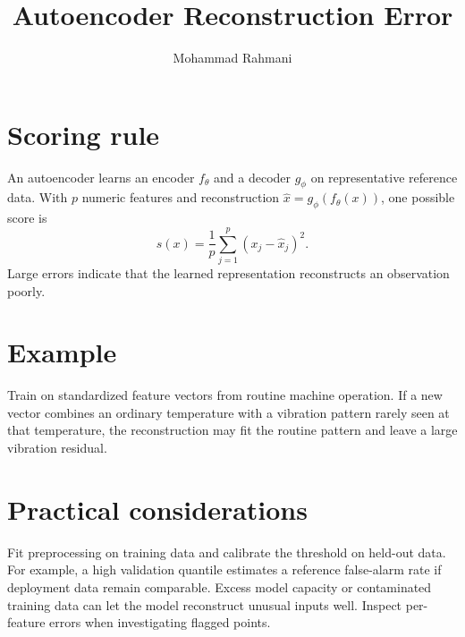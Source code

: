 \documentclass[a4paper]{article}
\title{Autoencoder Reconstruction Error}
\date{}
\author{Mohammad Rahmani}
\begin{document}
   \maketitle

\section{Scoring rule}
An autoencoder learns an encoder \(f_\theta\) and a decoder \(g_\phi\) on representative reference data. With \(p\) numeric features and reconstruction \(\hat x=g_\phi(f_\theta(x))\), one possible score is
\[
s(x)=\frac{1}{p}\sum_{j=1}^{p}(x_j-\hat x_j)^2.
\]
Large errors indicate that the learned representation reconstructs an observation poorly.

\section{Example}
Train on standardized feature vectors from routine machine operation. If a new vector combines an ordinary temperature with a vibration pattern rarely seen at that temperature, the reconstruction may fit the routine pattern and leave a large vibration residual.

\section{Practical considerations}
Fit preprocessing on training data and calibrate the threshold on held-out data. For example, a high validation quantile estimates a reference false-alarm rate if deployment data remain comparable. Excess model capacity or contaminated training data can let the model reconstruct unusual inputs well. Inspect per-feature errors when investigating flagged points.



   
   
\end{document}
